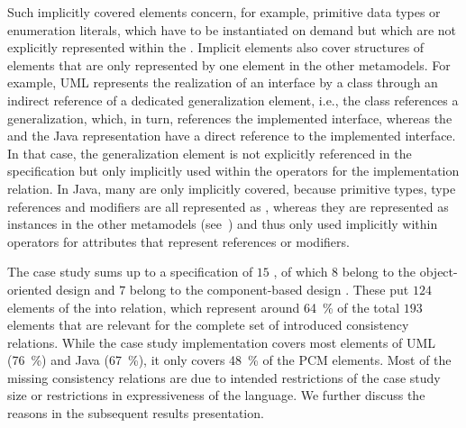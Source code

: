 Such implicitly covered elements concern, for example, primitive data types or enumeration literals, which have to be instantiated on demand but which are not explicitly represented within the \commonalities.
Implicit elements also cover structures of elements that are only represented by one element in the other metamodels.
For example, \gls{UML} represents the realization of an interface by a class through an indirect reference of a dedicated generalization element, i.e., the class references a generalization, which, in turn, references the implemented interface, whereas the \commonality and the Java representation have a direct reference to the implemented interface.
In that case, the generalization element is not explicitly referenced in the \commonality specification but only implicitly used within the operators for the implementation relation.
In Java, many \metaclasses are only implicitly covered, because primitive types, type references and modifiers are all represented as \metaclasses, whereas they are represented as instances in the other metamodels (see~) and thus only used implicitly within operators for attributes that represent references or modifiers.

The case study sums up to a specification of $15$ \commonalities, of which $8$ belong to the object-oriented design \conceptmetamodel and $7$ belong to the component-based design \conceptmetamodel.
These \commonalities put $124$ elements of the \concretemetamodels into relation, which represent around \SI{64}{\percent} of the total $193$ elements that are relevant for the complete set of introduced consistency relations.
While the case study implementation covers most elements of \gls{UML} (\SI{76}{\percent}) and Java (\SI{67}{\percent}), it only covers \SI{48}{\percent} of the \gls{PCM} elements.
Most of the missing consistency relations are due to intended restrictions of the case study size or restrictions in expressiveness of the \commonalities language.
We further discuss the reasons in the subsequent results presentation.

